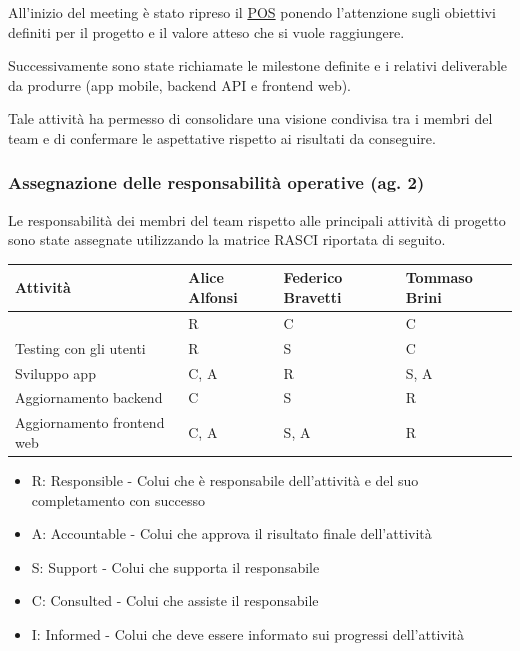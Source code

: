 \documentclass[11pt,a4paper]{article}
\providecommand{\tightlist}{\setlength{\itemsep}{0pt}\setlength{\parskip}{0pt}}
\newcounter{none}  %
\begin{document}
{All’inizio del meeting è stato ripreso il \hyperref[sec:pos]{POS} ponendo l’attenzione sugli obiettivi definiti per il progetto e il valore atteso che si vuole raggiungere.}

{Successivamente sono state richiamate le milestone definite e i relativi deliverable da produrre (app mobile, backend API e frontend web). }

{Tale attività ha permesso di consolidare una visione condivisa tra i membri del team e di confermare le aspettative rispetto ai risultati da conseguire.}

\subsubsection{\texorpdfstring{{Assegnazione delle responsabilità operative (ag. 2)}}{Assegnazione delle responsabilità operative (ag. 2)}}\label{h.h1flgr3hi6eb}

{Le responsabilità dei membri del team rispetto alle principali attività di progetto sono state assegnate utilizzando la matrice RASCI riportata di seguito.}

{}

{}

{}

{}

{\def\LTcaptype{none} %
\begin{longtable}[]{@{}>{\raggedright\arraybackslash}p{\dimexpr(\linewidth-8\tabcolsep)/4\relax}>{\raggedright\arraybackslash}p{\dimexpr(\linewidth-8\tabcolsep)/4\relax}>{\raggedright\arraybackslash}p{\dimexpr(\linewidth-8\tabcolsep)/4\relax}>{\raggedright\arraybackslash}p{\dimexpr(\linewidth-8\tabcolsep)/4\relax}@{}}
\toprule\noalign{}
\endhead
\bottomrule\noalign{}
\endlastfoot
\rowcolor{brandbg}\textbf{{Attività}} & \textbf{{Alice Alfonsi}} & \textbf{{Federico Bravetti}} & \textbf{{Tommaso Brini}} \\
\midrule
{Marketing} & {R} & {C} & {C} \\
\midrule
{Testing con gli utenti} & {R} & {S} & {C} \\
\midrule
{Sviluppo app} & {C, A} & {R} & {S, A} \\
\midrule
{Aggiornamento backend} & {C} & {S} & {R} \\
\midrule
{Aggiornamento frontend web} & {C, A} & {S, A} & {R} \\
\end{longtable}
}

\begin{itemize}
\tightlist
\item
  {R}{: Responsible - Colui che è responsabile dell’attività e del suo completamento con successo}
\item
  {A}{: Accountable - Colui che approva il risultato finale dell’attività}
\item
  {S}{: Support - Colui che supporta il responsabile}
\item
  {C}{: Consulted - Colui che assiste il responsabile}
\item
  {I}{: Informed - Colui che deve essere informato sui progressi dell’attività}
\end{itemize}
\end{document}

